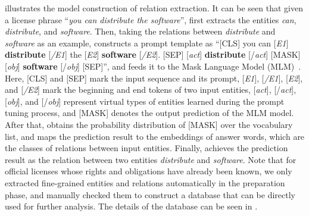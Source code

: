  illustrates the model construction of relation extraction. It can be seen that given a license phrase ``\textit{you can distribute the software}'', \tool first extracts the entities \textit{can}, \textit{distribute}, and \textit{software}.
Then, taking the relations between \textit{distribute} and \textit{software} as an example, \tool constructs a prompt template as ``{[CLS] you {can} [\textit{E1}] \textbf{distribute} [\textit{/E1}] the [\textit{E2}] \textbf{software} [\textit{/E2}]. [SEP] [\textit{act}] \textbf{distribute} [/\textit{act}] [MASK] [\textit{obj}] \textbf{software} [/\textit{obj}] [SEP]}'', 
and feeds it to the Mask Language Model (MLM)~\cite{Devlin2019BERT}. 
{Here, [CLS] and [SEP] mark the input sequence and its prompt, [\textit{E1}], [\textit{/E1}], [\textit{E2}], and [\textit{/E2}] mark the beginning and end tokens of two input entities, [\textit{act}], [/\textit{act}], [\textit{obj}], and [/\textit{obj}] represent virtual types of entities learned during the prompt tuning process, and [MASK] denotes the output prediction of the MLM model. }
After that, \tool obtains the probability distribution of {[MASK]} over the vocabulary list, and maps the prediction result to the embeddings of answer words, which are the classes of relations between input entities. Finally, \tool achieves the prediction result as the relation between two entities \textit{distribute} and \textit{software}. Note that for official licenses whose rights and obligations have already been known, we only extracted fine-grained entities and relations automatically in the preparation phase, and manually checked them to construct a database that can be directly used for further analysis. The details of the database can be seen in .

